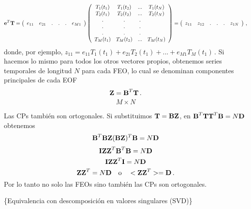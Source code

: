 \documentclass[
]{agujournal2019}
\begin{document}
\[{\textbf e}^T{\textbf T}=\left(\begin{array}{ccccccc}
   e_{11} &
   e_{21} & . & . & . & e_{M1} \\
        \end{array}\right)
    \left(\begin{array}{cccc}
   T_{1}(t_1) & T_{1}(t_2) & ... & T_{1}(t_N)\\
   T_{2}(t_1) & T_{2}(t_2) & ... & T_{2}(t_N)\\
                . & . & . \\
        . & . & . \\
        . & . & . \\
   T_{M}(t_1) & T_{M}(t_2) & ... & T_{M}(t_N)\\
        \end{array}\right)=
    \left(\begin{array}{ccccccc}
   z_{11} &
   z_{12} & . & . & . & z_{1N} \\
        \end{array}\right)\,,\] donde, por ejemplo,
\(z_{11}=e_{11}T_1(t_1)+ e_{21}T_2(t_1) + ... + e_{M1}T_M(t_1)\,.\) Si
hacemos lo mismo para todos los otros vectores propios, obtenemos series
temporales de longitud \(N\) para cada FEO, lo cual se denominan
componentes principales de cada EOF
\[{\textbf Z}={\textbf B}^T{\textbf T}\,.\] \[M\times N\]

Las CPs también son ortogonales. Si substituimos
\({\textbf T}={\textbf B}{\textbf Z}\), en
\({\textbf B}^T{\textbf T}{\textbf T}^T{\textbf B}=N{\textbf D}\)
obtenemos
\[{\textbf B}^T{\textbf B}{\textbf Z}({\textbf B}{\textbf Z})^T{\textbf B}=N{\textbf D}\]
\[{\textbf I}{\textbf Z}{\textbf Z}^T{\textbf B}^T{\textbf B}=N{\textbf D}\]
\[{\textbf I}{\textbf Z}{\textbf Z}^T{\textbf I}=N{\textbf D}\]
\[{\textbf Z}{\textbf Z}^T=N{\textbf D}\,\,\,\,\,\,{\rm o}\,\,\,\,\,\,<{\textbf Z}{\textbf Z}^T>={\textbf D}\,.\]
Por lo tanto no solo las FEOs sino también las CPs son ortogonales.

\vspace{0.25cm}

\{\textbf \noindent Equivalencia con descomposición en valores
singulares (SVD)\}
\end{document}
